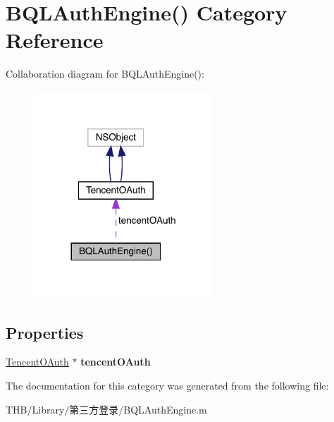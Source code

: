 \hypertarget{category_b_q_l_auth_engine_07_08}{}\section{B\+Q\+L\+Auth\+Engine() Category Reference}
\label{category_b_q_l_auth_engine_07_08}


Collaboration diagram for B\+Q\+L\+Auth\+Engine()\+:\nopagebreak
\begin{figure}[H]
\begin{center}
\leavevmode
\includegraphics[width=191pt]{category_b_q_l_auth_engine_07_08__coll__graph}
\end{center}
\end{figure}
\subsection*{Properties}
\begin{DoxyCompactItemize}
\item 
\mbox{\label{category_b_q_l_auth_engine_07_08_af38491fc5c582c17c6ea8c707ab6f28f}} 
\mbox{\hyperlink{interface_tencent_o_auth}{Tencent\+O\+Auth}} $\ast$ {\bfseries tencent\+O\+Auth}
\end{DoxyCompactItemize}


The documentation for this category was generated from the following file\+:\begin{DoxyCompactItemize}
\item 
T\+H\+B/\+Library/第三方登录/B\+Q\+L\+Auth\+Engine.\+m\end{DoxyCompactItemize}

